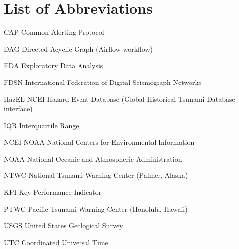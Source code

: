 \documentclass[a4paper,11pt,oneside]{book}
\begin{document}
    \setcounter{tocdepth}{0}
    \tableofcontents
    \setcounter{tocdepth}{1}
    \listoffigures
    \listoftables

    \chapter*{List of Abbreviations}
    \begin{abbrv}
        \item[CAP]      Common Alerting Protocol
        \item[DAG]      Directed Acyclic Graph (Airflow workflow)
        \item[EDA]      Exploratory Data Analysis
        \item[FDSN]     International Federation of Digital Seismograph Networks
        \item[HazEL]    NCEI Hazard Event Database (Global Historical Tsunami Database interface)
        \item[IQR]      Interquartile Range
        \item[NCEI]     NOAA National Centers for Environmental Information
        \item[NOAA]     National Oceanic and Atmospheric Administration
        \item[NTWC]     National Tsunami Warning Center (Palmer, Alaska)
        \item[KPI]      Key Performance Indicator
        \item[PTWC]     Pacific Tsunami Warning Center (Honolulu, Hawaii)
        \item[USGS]     United States Geological Survey
        \item[UTC]      Coordinated Universal Time
    \end{abbrv}

    \mainmatter
\end{document}
